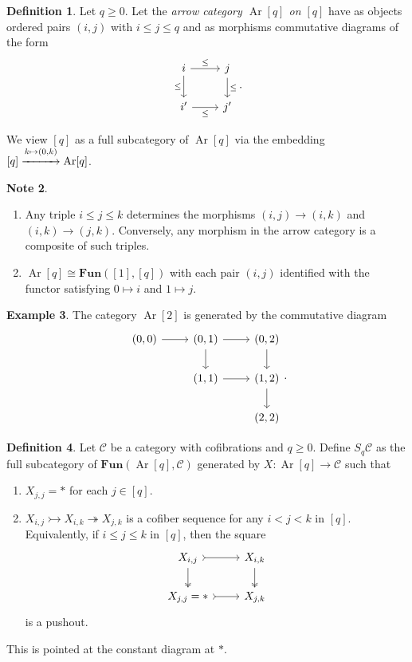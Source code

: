 \documentclass[10pt,letterpaper,cm]{nupset}
\theoremstyle{definition}
\newtheorem{definition}{Definition}
\newtheorem{exmp}[definition]{Example}
\newtheorem{note}[definition]{Note}
\theoremstyle{theorem}
\theoremstyle{remark}
\newcommand{\1}{\mathbf{1}}
\renewcommand{\c}{\mathscr{C}}
\newcommand{\0}{\vec 0}
\DeclareMathOperator{\Ar}{Ar}
\begin{document}
\begin{definition}
Let $q\geq 0$. Let the \textit{arrow category $\Ar[q]$ on $[q]$} have as objects ordered pairs $(i, j)$ with $i\leq j \leq q$ and as morphisms commutative diagrams of the form
\[
\begin{tikzcd}
i \arrow[d, "\leq"'] \arrow[r, "\leq"] & j \arrow[d, "\leq"] \\
i' \arrow[r, "\leq"'] & j'
\end{tikzcd}.
\] 
\end{definition}

We view $[q]$ as a full subcategory of $\Ar[q]$ via the embedding $[q] \overset{k \mapsto (0, k)}{\xrightarrow{\hspace*{1cm}}} \Ar[q]$.

\begin{note} $ $
\begin{enumerate}
\item Any triple $i\leq j \leq k$ determines the morphisms $(i, j) \to (i, k)$ and $(i, k) \to (j, k)$. Conversely, any morphism in the arrow category is a composite of such triples.
\item $\Ar[q] \cong \mathbf{Fun}([1], [q])$ with each pair $(i, j)$ identified with the functor satisfying $0 \mapsto i$ and $1 \mapsto j$.
\end{enumerate}
\end{note}

\begin{exmp}
The category $\Ar[2]$ is generated by the commutative diagram
\[
\begin{tikzcd}
{(0, 0)} \arrow[r] & {(0,1)} \arrow[r] \arrow[d] & {(0,2)} \arrow[d] \\
 & {(1, 1)} \arrow[r] & {(1,2)} \arrow[d] \\
 &  & {(2,2)}
\end{tikzcd} .
\]
\end{exmp}

\begin{definition}
Let $\c$ be a category with cofibrations and $q\geq 0$. Define $S_q\c$ as the full subcategory of $\mathbf{Fun}(\Ar[q], \c)$ generated by $X: \Ar[q] \to \c$ such that
\begin{enumerate}
\item $X_{j, j} = \ast$ for each $j \in [q]$.
\item $X_{i, j} \rightarrowtail X_{i, k} \twoheadrightarrow X_{j, k}$ is a cofiber sequence for any $i < j < k$ in $[q]$. Equivalently, if $i\leq j\leq k$ in $[q]$, then the square
\[
\begin{tikzcd}
{X_{i,j}} \arrow[d, two heads] \arrow[r, tail] & {X_{i,k}} \arrow[d, two heads] \\
{X_{j,j}=\ast} \arrow[r, tail] & {X_{j,k}}
\end{tikzcd}
\]
is a pushout. 
\end{enumerate}
This is pointed at the constant diagram at $\ast$.
\end{definition}
\end{document}
